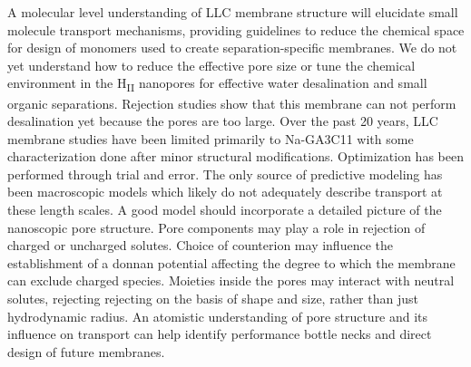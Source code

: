 A molecular level understanding of LLC membrane structure will elucidate
small molecule transport mechanisms, providing guidelines to reduce the
chemical space for design of monomers used to create separation-specific
membranes. We do not yet understand how to reduce the effective pore
size or tune the chemical environment in the H\textsubscript{II} 
nanopores for effective water desalination and small organic separations.
Rejection studies show that this membrane can not perform desalination yet 
because the pores are too large\cite{zhou_supported_2005}. Over the past
20 years, LLC membrane studies have been limited primarily 
to Na-GA3C11 with some characterization done after minor structural 
modifications\cite{resel_structural_2000}. Optimization has been 
performed through trial and error. The only source of predictive modeling
has been macroscopic models which likely do not adequately describe 
transport at these length scales. A good model should incorporate a 
detailed picture of the nanoscopic pore structure. Pore components may 
play a role in rejection of charged or uncharged solutes. Choice of 
counterion may influence the establishment of a donnan potential
affecting the degree to which the membrane can exclude charged species.
Moieties inside the pores may interact with neutral solutes, rejecting
rejecting on the basis of shape and size, rather than just hydrodynamic
radius. An atomistic understanding of pore structure and its influence on
transport can help identify performance bottle necks and direct design of
future membranes. 

